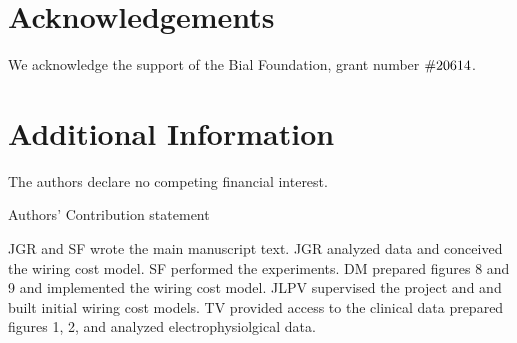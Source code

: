 \documentclass[11pt, onecolumn]{article}
\begin{document}
\section*{Acknowledgements}
We acknowledge the support of the Bial Foundation, grant number  $\#206\/14$.
\section*{Additional Information}
The authors declare no competing financial interest.


%



Authors' Contribution statement

JGR and SF wrote the main manuscript text. JGR analyzed data and conceived the wiring cost model. SF performed the experiments. DM prepared figures 8 and 9 and implemented the wiring cost model. JLPV supervised the project and and built initial wiring cost models. TV provided access to the clinical data prepared figures 1, 2, and analyzed electrophysiolgical data.
\end{document}
